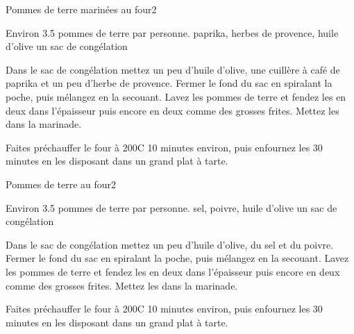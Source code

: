 \begin{recette}{Pommes de terre marinées au four}{2}{}{}
\begin{ingredients}
\ingredient Environ 3.5 pommes de terre par personne.
\ingredient paprika, herbes de provence, huile d'olive
\ingredient un sac de congélation
\end{ingredients}

\begin{preparation}
\etape Dans le sac de congélation mettez un peu d'huile d'olive, une cuillère à café de paprika et un peu d'herbe de provence. Fermer le fond du sac en spiralant la poche, puis mélangez en la secouant.
\etape Lavez les pommes de terre et fendez les en deux dans l'épaisseur puis encore en deux comme des grosses frites.
\etape Mettez les dans la marinade.
\end{preparation}

\begin{cuisson}
Faites préchauffer le four à 200\degres C 10 minutes environ, puis enfournez les 30 minutes en les disposant dans un grand plat à tarte.
\end{cuisson}
\end{recette}

\begin{recette}{Pommes de terre au four}{2}{}{}\label{sec:pomme-de-terre-four}
\begin{ingredients}
\ingredient Environ 3.5 pommes de terre par personne.
\ingredient sel, poivre, huile d'olive
\ingredient un sac de congélation
\end{ingredients}

\begin{preparation}
\etape Dans le sac de congélation mettez un peu d'huile d'olive, du sel et du poivre. Fermer le fond du sac en spiralant la poche, puis mélangez en la secouant.
\etape Lavez les pommes de terre et fendez les en deux dans l'épaisseur puis encore en deux comme des grosses frites.
\etape Mettez les dans la marinade.
\end{preparation}

\begin{cuisson}
Faites préchauffer le four à 200\degres C 10 minutes environ, puis enfournez les 30 minutes en les disposant dans un grand plat à tarte.
\end{cuisson}

\end{recette}

